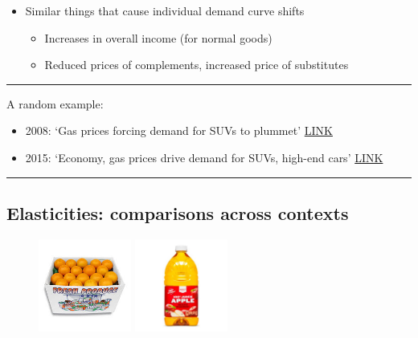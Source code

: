 \documentclass[]{article}
\providecommand{\tightlist}{%
  \setlength{\itemsep}{0pt}\setlength{\parskip}{0pt}}
\begin{document}
\begin{itemize}
\tightlist
\item
  Similar things that cause individual demand curve shifts

  \begin{itemize}
  \tightlist
  \item
    Increases in overall income (for normal goods)
  \item
    Reduced prices of complements, increased price of substitutes
  \end{itemize}

  \bigskip
\end{itemize}


\begin{center}\rule{0.5\linewidth}{\linethickness}\end{center}

A random example:

\begin{itemize}
\item
  2008: `Gas prices forcing demand for SUVs to plummet'
  \href{http://www.thehour.com/wilton/article/Gas-prices-forcing-demand-for-SUVs-to-plummet-8257785.php}{LINK}
\item
  2015: `Economy, gas prices drive demand for SUVs, high-end cars'
  \href{http://www.sj-r.com/article/20150809/NEWS/150809569}{LINK}
\end{itemize}

\begin{center}\rule{0.5\linewidth}{\linethickness}\end{center}

\hypertarget{elasticities-comparisons-across-contexts}{%
\subsection{Elasticities: comparisons across
contexts}\label{elasticities-comparisons-across-contexts}}

\begin{figure}
   \includegraphics[height=1.2in]{picsfigs/naveloranges.jpeg}
   \includegraphics[height=1.2in]{picsfigs/applejuice.jpeg}
\end{figure}
\end{document}
